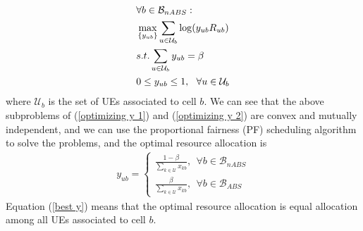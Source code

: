 \documentclass[journal]{IEEETran}
\begin{document}
\begin{align} \label{optimizing y 2}
&\forall b \in \mathcal{B}_{nABS} : \nonumber \\
& \max_{\{y_{ub}\}} \sum_{u \in \mathcal{U}_b} \log (y_{ub}R_{ub})\\
& s.t.\sum_{u \in \mathcal{U}_b} y_{ub} = \beta \notag \\
& 0 \leq y_{ub} \leq 1,~~\forall u \in \mathcal{U}_b \notag
\end{align}
where $\mathcal{U}_b$ is the set of UEs associated to cell $b$. We can see that the above subproblems of (\ref{optimizing y 1}) and (\ref{optimizing y 2}) are convex and mutually independent, and we can use the proportional fairness (PF) scheduling algorithm \cite{PFSchedulingAlgorithm} to solve the problems, and the optimal resource allocation is \cite{PFSchedulingAlgorithm}
\begin{align}\label{best y}
  y_{ub} = \left\{
\begin{matrix}
{ \frac{1 - \beta}{ \sum_{k \in \mathcal{U}}{x_{kb}}},~~\forall b \in \mathcal{B}_{nABS} } \\
{ \frac{\beta}{ \sum_{k \in \mathcal{U}}{x_{kb}}},~~\forall b \in \mathcal{B}_{ABS} }
\end{matrix}
\right.
\end{align}
Equation (\ref{best y}) means that the optimal resource allocation is equal allocation among all UEs associated to cell $b$.
\end{document}
